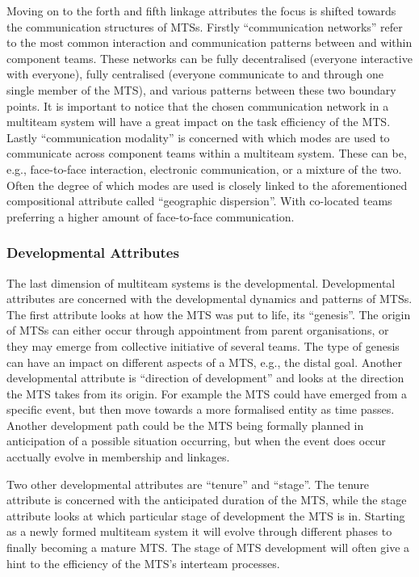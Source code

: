 Moving on to the forth and fifth linkage attributes the focus is shifted towards the communication structures of MTSs. Firstly ``communication networks'' refer to the most common interaction and communication patterns between and within component teams. These networks can be fully decentralised (everyone interactive with everyone), fully centralised (everyone communicate to and through one single member of the MTS), and various patterns between these two boundary points. It is important to notice that the chosen communication network in a multiteam system will have a great impact on the task efficiency of the MTS. Lastly ``communication modality'' is concerned with which modes are used to communicate across component teams within a multiteam system. These can be, e.g., face-to-face interaction, electronic communication, or a mixture of the two. Often the degree of which modes are used is closely linked to the aforementioned compositional attribute called ``geographic dispersion''. With co-located teams preferring a higher amount of face-to-face communication.

\subsubsection{Developmental Attributes}

The last dimension of multiteam systems is the developmental. Developmental attributes are concerned with the developmental dynamics and patterns of MTSs. The first attribute looks at how the MTS was put to life, its ``genesis''. The origin of MTSs can either occur through appointment from parent organisations, or they may emerge from collective initiative of several teams. The type of genesis can have an impact on different aspects of a MTS, e.g., the distal goal. Another developmental attribute is ``direction of development'' and looks at the direction the MTS takes from its origin. For example the MTS could have emerged from a specific event, but then move towards a more formalised entity as time passes. Another development path could be the MTS being formally planned in anticipation of a possible situation occurring, but when the event does occur acctually evolve in membership and linkages.

Two other developmental attributes are ``tenure'' and ``stage''. The tenure attribute is concerned with the anticipated  duration of the MTS, while the stage attribute looks at which particular stage of development the MTS is in. Starting as a newly formed multiteam system it will evolve through different phases to finally becoming a mature MTS. The stage of MTS development will often give a hint to the efficiency of the MTS's interteam processes. 


